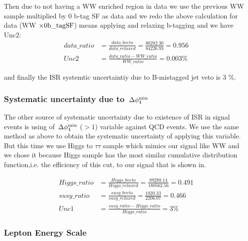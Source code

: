 
Then due to not having a WW enriched region in data we use the previous WW sample multiplied by 0 b-tag SF as data and we redo the above calculation for data (WW $\times {\rm 0b\_tag SF}$) means applying and relaxing b-tagging and we have Unc2:
\begin{align}
data\_ratio &= \frac{data\_bveto}{data\_relaxed} = \frac{80282.30}{84226.93} = 0.956 \\ \nonumber
Unc2 &= \frac{data\_ratio - WW\_ratio}{WW\_ratio} = 0.003 \%
\end{align}

and finally the ISR systemtic uncertaintiy due to B-mistagged jet veto is 3 \%.

\subsubsection{\texorpdfstring{Systematic uncertainty due to $\,{\Delta\phi_{4}^{\rm min}}$}{Systematic uncertainty due to minDeltaPhi4}}
The other source of systematic uncertainty due to existence of ISR in signal events is using of $\,{\Delta\phi_{4}^{\rm min}}$ ($ > 1$) variable against QCD events. We use the same method as above to obtain the systematic uncertainty of applying this variable. But this time we use Higgs to $\tau \tau$ sample which mimics our signal like WW and we chose it because Higgs sample has the most similar cumulative distribution function,i.e. the efficiency of this cut, to our signal that is shown in. %

\begin{align}
Higgs\_ratio &= \frac{Higgs\_bveto}{Higgs\_relaxed} = \frac{89288.14}{180562.56} = 0.491 \\ \nonumber
susy\_ratio &= \frac{susy\_bveto}{susy\_relaxed} = \frac{1020.33}{2206.07} = 0.466 \\ \nonumber
Unc1 &= \frac{susy\_ratio - Higgs\_ratio}{Higgs\_ratio} = 3 \% 
\end{align}


\subsubsection{Lepton Energy Scale}

